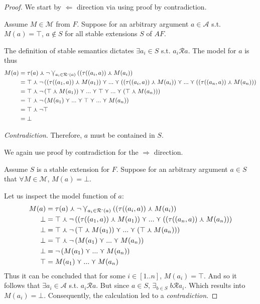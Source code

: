 \documentclass{article}
\newcommand{\args}{\mathcal{A}} %
\newcommand{\att}{\mathcal{R}}  %
\newcommand{\attackers}[1]{\att^\text{-}\left(#1\right)}
\newcommand{\modelset}{\mathcal{M}}   %
\newcommand{\tupd}{\curlywedge}
\newcommand{\tatt}{\curlyvee}
\newcommand{\Tatt}{\varcurlyvee}
\begin{document}
\begin{proof}

We start by  $\Leftarrow$ direction via using proof by contradiction. 

Assume $M \in\modelset$ from $F$. Suppose for an arbitrary argument $a \in \args$ s.t. $M(a) = \top$, $a \notin S$  for all stable extensions $S$ of $AF$.

The definition of stable semantics dictates $\exists a_{i} \in S$ s.t. $a_{i}\att{a}$. The model for $a$ is thus
\begin{align*}
M(a) &= \tau(a) \tupd \neg \Tatt_{a_i \in \attackers a} ((\tau((a_i, a)) \tupd M(a_i)) \\
     &= \top \tupd \neg \left ((\tau((a_1, a)) \tupd M(a_1)) \tatt ... \tatt  ((\tau((a_i, a)) \tupd M(a_i)) \tatt ... \tatt  ((\tau((a_n, a)) \tupd M(a_n)) \right ) \\%
     &= \top \tupd \neg \left (\top \tupd M(a_1)) \tatt ... \tatt  \top \tatt ... \tatt  (\top \tupd M(a_n)) \right ) \\
     &= \top \tupd \neg \left ( M(a_1) \tatt ... \tatt \top \tatt ... \tatt M(a_n) \right ) \\
     &= \top \tupd \neg \top \\
     &= \bot
\end{align*}

\emph{Contradiction}. Therefore, $a$ must be contained in $S$.

\vspace{10 mm}

We again use proof by contradiction for the $\Rightarrow$ direction. 

Assume $S$ is a stable extension for $F.$
Suppose  for an arbitrary argument $ a \in S$ that $\forall M \in \modelset$, $ M(a) = \bot$. 

Let us inspect the model function of $a$:
\begin{align*}
M(a) &= \tau(a) \tupd \neg \Tatt_{a_i \in \attackers a} ((\tau((a_i, a)) \tupd M(a_i)) \\
\bot  &= \top \tupd \neg \left ((\tau((a_1, a)) \tupd M(a_1)) \tatt ... \tatt  ((\tau((a_n, a)) \tupd M(a_n)) \right ) \\%
\bot     &= \top \tupd \neg \left (\top \tupd M(a_1)) \tatt ...  \tatt  (\top \tupd M(a_n)) \right ) \\
\bot    &= \top \tupd \neg \left ( M(a_1) \tatt ... \tatt M(a_n) \right ) \\
\bot    &=  \neg \left ( M(a_1) \tatt ...  \tatt M(a_n) \right ) \\
\top    &=    M(a_1) \tatt ...  \tatt M(a_n) \\
\end{align*}
Thus it can be concluded that for some $i \in[1..n]$, $M(a_i) = \top$. And so it follows that $\exists {a_i} \in \args$ s.t. $a_i\att{a}$. But since $a \in S$, $\exists_{b\in S}\; b\att{a_i}$. Which results into $M(a_i) = \bot$. Consequently, the calculation led to a \emph{contradiction}.

\end{proof}
\end{document}
